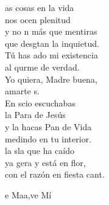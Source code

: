 \begin{cancion}%
	as cosas en la vida\\
	nos ocen plenitud\\
	y no n más que mentiras\\
	que desgtan la inquietud.\\
	Tú has ado mi existencia\\
	al qurme de verdad.\\
	Yo quiera, Madre buena,\\
	amarte s.	\\
	En scio escuchabas\\
	la Para de Jesús\\
	y la hacas Pan de Vida\\
	medindo en tu interior.\\
	la sla que ha caído\\
	ya gera y está en flor,\\
	con el razón en fiesta cant. \\
	\begin{chorus}%
	e Maa,ve Mí\\
	\end{chorus}%
\end{cancion}%
